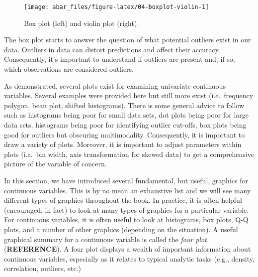 \documentclass[]{book}
\theoremstyle{definition}
\theoremstyle{definition}
\theoremstyle{definition}
\theoremstyle{remark}
\begin{document}
\begin{figure}

{\centering \texttt{[image: abar\_files/figure-latex/04-boxplot-violin-1]} 

}

\caption{Box plot (left) and violin plot (right).}\label{fig:04-boxplot-violin}
\end{figure}

The box plot starts to answer the question of what potential outliers
exist in our data. Outliers in data can distort predictions and affect
their accuracy. Consequently, it's important to understand if outliers
are present and, if so, which observations are considered outliers.

As demonstrated, several plots exist for examining univariate continuous
variables. Several examples were provided here but still more exist
(i.e.~frequency polygon, bean plot, shifted histograms). There is some
general advice to follow such as histograms being poor for small data
sets, dot plots being poor for large data sets, histograms being poor
for identifying outlier cut-offs, box plots being good for outliers but
obscuring multimodality. Consequently, it is important to draw a variety
of plots. Moreover, it is important to adjust parameters within plots
(i.e.~bin width, axis transformation for skewed data) to get a
comprehensive picture of the variable of concern.

In this section, we have introduced several fundamental, but useful,
graphics for continuous variables. This is by no mean an exhaustive list
and we will see many different types of graphics throughout the book. In
practice, it is often helpful (encouraged, in fact) to look at many
types of graphics for a particular variable. For continuous variables,
it is often useful to look at histograms, box plots, Q-Q plots, and a
number of other graphics (depending on the situation). A useful
graphical summary for a continuous variable is called the \emph{four
plot} (\textbf{REFERENCE}). A four plot displays a wealth of important
information about continuous variables, especially as it relates to
typical analytic tasks (e.g., density, correlation, outliers, etc.)
\end{document}
